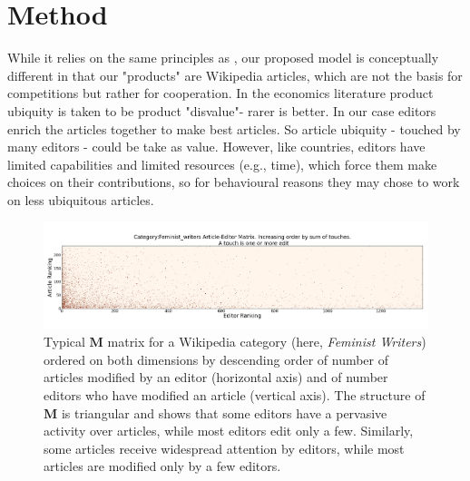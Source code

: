 \section{Method}
While it relies on the same principles as \cite{caldarelli2012network}, our proposed model is conceptually different in that our "products" are Wikipedia articles, which are not the basis for competitions but rather for cooperation. In the economics literature product ubiquity is taken to be product "disvalue"- rarer is better. In our case editors enrich the articles together to make best articles. So article ubiquity - touched by many editors - could be take as value.  However, like countries, editors have limited capabilities and limited resources (e.g., time), which force them make choices on their contributions, so for behavioural reasons they may chose to work on less ubiquitous articles.

\begin{figure}[!t]
\centering
\includegraphics[width=2.0\columnwidth]{Figures/Category_Feminist_writerstriangle_matrix_corrected.png}
\caption{Typical $\mathbf{M}$ matrix for a Wikipedia category (here, {\it Feminist Writers}) ordered on both dimensions by descending order of number of articles modified by an editor (horizontal axis) and of number editors who have modified an article (vertical axis). The structure of $\mathbf{M}$ is triangular and shows that some editors have a pervasive activity over articles, while most editors edit only a few. Similarly, some articles receive widespread attention by editors, while most articles are modified only by a few editors.}
\label{fig:triangle}
\end{figure}

